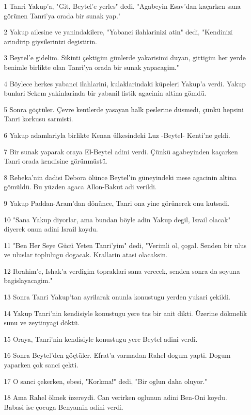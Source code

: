 \par 1 Tanri Yakup'a, "Git, Beytel'e yerles" dedi, "Agabeyin Esav'dan kaçarken sana görünen Tanri'ya orada bir sunak yap."
\par 2 Yakup ailesine ve yanindakilere, "Yabanci ilahlarinizi atin" dedi, "Kendinizi arindirip giysilerinizi degistirin.
\par 3 Beytel'e gidelim. Sikinti çektigim günlerde yakarisimi duyan, gittigim her yerde benimle birlikte olan Tanri'ya orada bir sunak yapacagim."
\par 4 Böylece herkes yabanci ilahlarini, kulaklarindaki küpeleri Yakup'a verdi. Yakup bunlari Sekem yakinlarinda bir yabanil fistik agacinin altina gömdü.
\par 5 Sonra göçtüler. Çevre kentlerde yasayan halk peslerine düsmedi, çünkü hepsini Tanri korkusu sarmisti.
\par 6 Yakup adamlariyla birlikte Kenan ülkesindeki Luz -Beytel- Kenti'ne geldi.
\par 7 Bir sunak yaparak oraya El-Beytel adini verdi. Çünkü agabeyinden kaçarken Tanri orada kendisine görünmüstü.
\par 8 Rebeka'nin dadisi Debora ölünce Beytel'in güneyindeki mese agacinin altina gömüldü. Bu yüzden agaca Allon-Bakut adi verildi.
\par 9 Yakup Paddan-Aram'dan dönünce, Tanri ona yine görünerek onu kutsadi.
\par 10 "Sana Yakup diyorlar, ama bundan böyle adin Yakup degil, Israil olacak" diyerek onun adini Israil koydu.
\par 11 "Ben Her Seye Gücü Yeten Tanri'yim" dedi, "Verimli ol, çogal. Senden bir ulus ve uluslar toplulugu dogacak. Krallarin atasi olacaksin.
\par 12 Ibrahim'e, Ishak'a verdigim topraklari sana verecek, senden sonra da soyuna bagislayacagim."
\par 13 Sonra Tanri Yakup'tan ayrilarak onunla konustugu yerden yukari çekildi.
\par 14 Yakup Tanri'nin kendisiyle konustugu yere tas bir anit dikti. Üzerine dökmelik sunu ve zeytinyagi döktü.
\par 15 Oraya, Tanri'nin kendisiyle konustugu yere Beytel adini verdi.
\par 16 Sonra Beytel'den göçtüler. Efrat'a varmadan Rahel dogum yapti. Dogum yaparken çok sanci çekti.
\par 17 O sanci çekerken, ebesi, "Korkma!" dedi, "Bir oglun daha oluyor."
\par 18 Ama Rahel ölmek üzereydi. Can verirken oglunun adini Ben-Oni koydu. Babasi ise çocuga Benyamin adini verdi.

